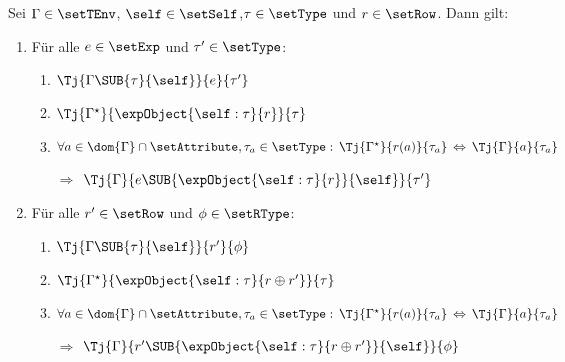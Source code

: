 \begin{lemma} \label{lemma:Losrt:Typurteile_und_self_Substitution}
  Sei $\Gamma \in \setTEnv$, $\self\in\setSelf$,\linebreak[4] $\tau\in\setType$ und $r\in\setRow$. Dann gilt:
  \renewcommand{\labelenumii}{(\arabic{enumii})}
  \begin{enumerate}
    \item F\"ur alle $e\in\setExp$ und $\tau'\in\setType$:
          \begin{enumerate}
            \item $\Tj{\Gamma\SUB{\tau}{\self}}{e}{\tau'}$
            \item $\Tj{\Gamma^\star}{\expObject{\self:\tau}{r}}{\tau}$
            \item $\forall a\in\dom{\Gamma}\cap\setAttribute,\tau_a\in\setType:\,
                   \Tj{\Gamma^\star}{r(a)}{\tau_a}\,\Leftrightarrow\,\Tj{\Gamma}{a}{\tau_a}$
            \item[$\Rightarrow$] $\Tj{\Gamma}{e\SUB{\expObject{\self:\tau}{r}}{\self}}{\tau'}$
          \end{enumerate}

    \item F\"ur alle $r'\in\setRow$ und $\phi\in\setRType$:
          \begin{enumerate}
            \item $\Tj{\Gamma\SUB{\tau}{\self}}{r'}{\phi}$
            \item $\Tj{\Gamma^\star}{\expObject{\self:\tau}{r \oplus r'}}{\tau}$
            \item $\forall a\in\dom{\Gamma}\cap\setAttribute,\tau_a\in\setType:\,
                   \Tj{\Gamma^\star}{r(a)}{\tau_a}\,\Leftrightarrow\,\Tj{\Gamma}{a}{\tau_a}$
            \item[$\Rightarrow$] $\Tj{\Gamma}{r'\SUB{\expObject{\self:\tau}{r \oplus r'}}{\self}}{\phi}$
          \end{enumerate}
  \end{enumerate}
  \renewcommand{\labelenumii}{\arabic{enumii}.}
\end{lemma}

